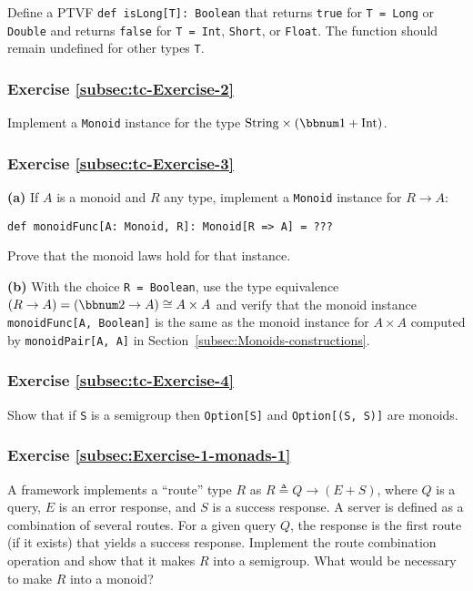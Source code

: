 Define a PTVF \lstinline!def isLong[T]: Boolean! that returns \lstinline!true!
for \lstinline!T = Long! or \lstinline!Double! and returns \lstinline!false!
for \lstinline!T = Int!, \lstinline!Short!, or \lstinline!Float!.
The function should remain undefined for other types \lstinline!T!.

\subsubsection{Exercise \label{subsec:tc-Exercise-2}\ref{subsec:tc-Exercise-2}}

Implement a \lstinline!Monoid! instance for the type $\text{String}\times(\bbnum 1+\text{Int})$.

\subsubsection{Exercise \label{subsec:tc-Exercise-3}\ref{subsec:tc-Exercise-3}}

\textbf{(a)} If $A$ is a monoid and $R$ any type, implement a \lstinline!Monoid!
instance for $R\rightarrow A$:
\begin{lstlisting}
def monoidFunc[A: Monoid, R]: Monoid[R => A] = ???
\end{lstlisting}
Prove that the monoid laws hold for that instance.

\textbf{(b)} With the choice \lstinline!R = Boolean!, use the type
equivalence $(R\rightarrow A)=(\bbnum 2\rightarrow A)\cong A\times A$
and verify that the monoid instance \lstinline!monoidFunc[A, Boolean]!
is the same as the monoid instance for $A\times A$ computed by \lstinline!monoidPair[A, A]!
in Section~\ref{subsec:Monoids-constructions}.

\subsubsection{Exercise \label{subsec:tc-Exercise-4}\ref{subsec:tc-Exercise-4}}

Show that if \lstinline!S! is a semigroup then \lstinline!Option[S]!
and \lstinline!Option[(S, S)]! are monoids.

\subsubsection{Exercise \label{subsec:Exercise-1-monads-1}\ref{subsec:Exercise-1-monads-1}}

A framework implements a \textsf{``}route\textsf{''} type $R$ as $R\triangleq Q\rightarrow(E+S)$,
where $Q$ is a query, $E$ is an error response, and $S$ is a success
response. A server is defined as a combination of several routes.
For a given query $Q$, the response is the first route (if it exists)
that yields a success response. Implement the route combination operation
and show that it makes $R$ into a semigroup. What would be necessary
to make $R$ into a monoid?

